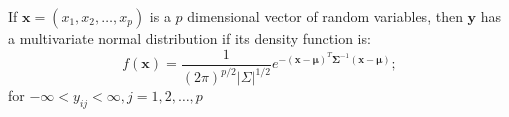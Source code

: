 \begin{definition}
\label{def:mvnpdf}

If $\boldsymbol{x} = (x_{1}, x_{2}, \ldots, x_{p})$ is a $p$ dimensional vector of random variables, then $\boldsymbol{y}$ has a multivariate normal distribution if its density function is:
\begin{displaymath}
\label{eq:mvnpdf}
f(\boldsymbol{x}) = \frac{1}{(2 \pi)^{p/2} |\Sigma|^{1/2}}
e^{-(\boldsymbol{x - \mu})^{T}\boldsymbol{\Sigma}^{-1} (\boldsymbol{x
    - \mu})};
\end{displaymath}
for $ -\infty < y_{ij} < \infty, j = 1, 2, \ldots, p$


\end{definition}
